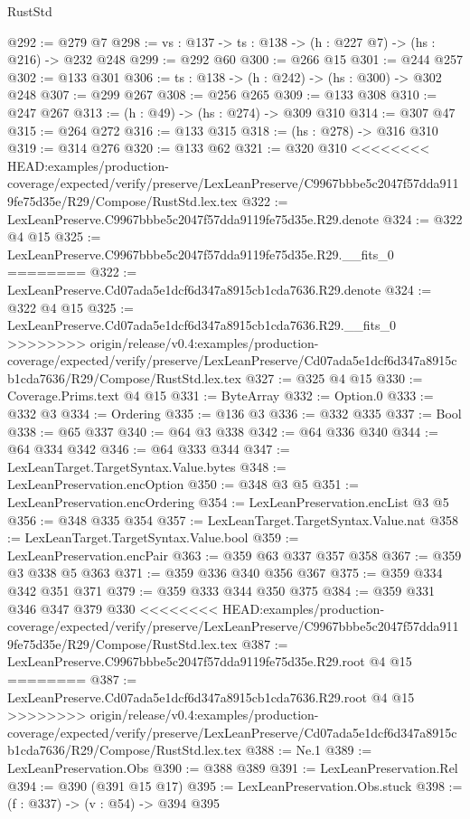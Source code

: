 \begin{lexlean}{RustStd}
\begin{coremodule}
{\begin{coremodule}
@292 := @279 @7
@298 := {vs : @137} -> {ts : @138} -> (h : @227 @7) -> (hs : @216) -> @232 @248
@299 := @292 @60
@300 := @266 @15
@301 := @244 @257
@302 := @133 @301
@306 := {ts : @138} -> (h : @242) -> (hs : @300) -> @302 @248
@307 := @299 @267
@308 := @256 @265
@309 := @133 @308
@310 := @247 @267
@313 := (h : @49) -> (hs : @274) -> @309 @310
@314 := @307 @47
@315 := @264 @272
@316 := @133 @315
@318 := (hs : @278) -> @316 @310
@319 := @314 @276
@320 := @133 @62
@321 := @320 @310
<<<<<<<< HEAD:examples/production-coverage/expected/verify/preserve/LexLeanPreserve/C9967bbbe5c2047f57dda9119fe75d35e/R29/Compose/RustStd.lex.tex
@322 := LexLeanPreserve.C9967bbbe5c2047f57dda9119fe75d35e.R29.denote
@324 := @322 @4 @15
@325 := LexLeanPreserve.C9967bbbe5c2047f57dda9119fe75d35e.R29.__fits_0
========
@322 := LexLeanPreserve.Cd07ada5e1dcf6d347a8915cb1cda7636.R29.denote
@324 := @322 @4 @15
@325 := LexLeanPreserve.Cd07ada5e1dcf6d347a8915cb1cda7636.R29.__fits_0
>>>>>>>> origin/release/v0.4:examples/production-coverage/expected/verify/preserve/LexLeanPreserve/Cd07ada5e1dcf6d347a8915cb1cda7636/R29/Compose/RustStd.lex.tex
@327 := @325 @4 @15
@330 := Coverage.Prims.text @4 @15
@331 := ByteArray
@332 := Option.{0}
@333 := @332 @3
@334 := Ordering
@335 := @136 @3
@336 := @332 @335
@337 := Bool
@338 := @65 @337
@340 := @64 @3 @338
@342 := @64 @336 @340
@344 := @64 @334 @342
@346 := @64 @333 @344
@347 := LexLeanTarget.TargetSyntax.Value.bytes
@348 := LexLeanPreservation.encOption
@350 := @348 @3 @5
@351 := LexLeanPreservation.encOrdering
@354 := LexLeanPreservation.encList @3 @5
@356 := @348 @335 @354
@357 := LexLeanTarget.TargetSyntax.Value.nat
@358 := LexLeanTarget.TargetSyntax.Value.bool
@359 := LexLeanPreservation.encPair
@363 := @359 @63 @337 @357 @358
@367 := @359 @3 @338 @5 @363
@371 := @359 @336 @340 @356 @367
@375 := @359 @334 @342 @351 @371
@379 := @359 @333 @344 @350 @375
@384 := @359 @331 @346 @347 @379 @330
<<<<<<<< HEAD:examples/production-coverage/expected/verify/preserve/LexLeanPreserve/C9967bbbe5c2047f57dda9119fe75d35e/R29/Compose/RustStd.lex.tex
@387 := LexLeanPreserve.C9967bbbe5c2047f57dda9119fe75d35e.R29.root @4 @15
========
@387 := LexLeanPreserve.Cd07ada5e1dcf6d347a8915cb1cda7636.R29.root @4 @15
>>>>>>>> origin/release/v0.4:examples/production-coverage/expected/verify/preserve/LexLeanPreserve/Cd07ada5e1dcf6d347a8915cb1cda7636/R29/Compose/RustStd.lex.tex
@388 := Ne.{1}
@389 := LexLeanPreservation.Obs
@390 := @388 @389
@391 := LexLeanPreservation.Rel
@394 := @390 (@391 @15 @17)
@395 := LexLeanPreservation.Obs.stuck
@398 := (f : @337) -> (v : @54) -> @394 @395

\end{coremodule}}
\end{coremodule}
\end{lexlean}
